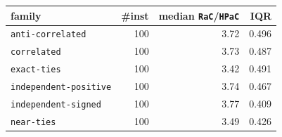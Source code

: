 \begin{tabular}{@{}lrrr@{}}
\toprule
family & \#inst & median \texttt{RaC}/\texttt{HPaC} & IQR \\
\midrule
\texttt{anti-correlated} & 100 & 3.72 & 0.496 \\
\texttt{correlated} & 100 & 3.73 & 0.487 \\
\texttt{exact-ties} & 100 & 3.42 & 0.491 \\
\texttt{independent-positive} & 100 & 3.74 & 0.467 \\
\texttt{independent-signed} & 100 & 3.77 & 0.409 \\
\texttt{near-ties} & 100 & 3.49 & 0.426 \\
\bottomrule
\end{tabular}
